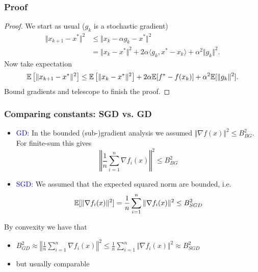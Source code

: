 \documentclass[aspectratio=149]{beamer}
\begin{document}
\begin{frame}
  \frametitle{Proof}
  \begin{proof}

  We start as usual ($g_k$ is a stochastic gradient)
  \begin{equation}
    \begin{aligned}
      \Vert x_{k+1} - x^* \Vert^2 &\le \Vert x_k - \alpha g_k - x^* \Vert^2 \\
      &= \Vert x_k-x^* \Vert^2 + 2 \alpha \langle g_k, x^*-x_k \rangle + \alpha^2 \Vert g_k \Vert^2.
    \end{aligned}
  \end{equation}
  Now take expectation
  \begin{equation}
      \mathbb{E} \left[\Vert x_{k+1} - x^* \Vert^2\right] \le \mathbb{E} \left[\Vert x_k-x^* \Vert^2\right] + 2 \alpha \mathbb{E}[f^*- f(x_k)]+ \alpha^2 \mathbb{E}[\Vert g_k \Vert^2].
  \end{equation}
  Bound gradients and telescope to finish the proof.
  \end{proof}
\end{frame}

\begin{frame}
  \frametitle{Comparing constants: SGD vs. GD}
  \begin{itemize}
    \item \textcolor{blue}{GD:} In the bounded (sub-)gradient analysis we assumed $\Vert \nabla f(x) \Vert^2 \le B_{BG}^2$. For finite-sum this gives
          \begin{equation}
            \left\Vert \frac{1}{n}\sum_{i=1}^{n}\nabla f_i(x) \right\Vert^2 \le B_{BG}^2
          \end{equation}
    \item \textcolor{blue}{SGD:} We assumed that the expected squared norm are bounded, i.e.
          \begin{equation}
            \mathbb{E}[ \Vert \nabla f_i(x) \Vert^2 ] = \frac{1}{n} \sum_{i=1}^{n} \Vert \nabla f_i(x) \Vert^2 \le B_{SGD}^2
          \end{equation}
  \end{itemize}

  By convexity we have that
  \begin{itemize}
    \item $B_{GD}^2 \approx \left\Vert \frac{1}{n}\sum_{i=1}^{n}\nabla f_i(x) \right\Vert^2 \le \frac{1}{n} \sum_{i=1}^{n} \Vert \nabla f_i(x) \Vert^2 \approx B_{SGD}^2$
    \item but usually comparable
  \end{itemize}
\end{frame}
\end{document}
